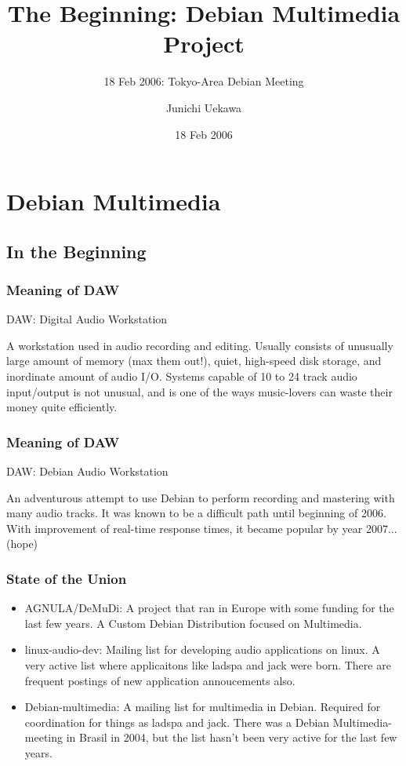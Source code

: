 \documentclass[dvipdfm]{beamer}
\title[Tokyo-Area Debian Meeting]{The Beginning: Debian Multimedia Project}
\subtitle{18 Feb 2006: Tokyo-Area Debian Meeting}
\author{Junichi Uekawa}
\date{18 Feb 2006}
\begin{document}
\frame{\titlepage{}}
 
 \section{Debian Multimedia}
 \subsection{In the Beginning}
 \begin{frame}
  \frametitle{Meaning of DAW}
   DAW: Digital Audio Workstation

  A workstation used in audio recording and editing. Usually consists of
  unusually large amount of memory (max them out!), quiet, high-speed
  disk storage, and inordinate amount of audio I/O. Systems capable of
  10 to 24 track audio input/output is not unusual, and is one of the
  ways music-lovers can waste their money quite efficiently.

 \end{frame}
 
 \begin{frame}
  \frametitle{Meaning of DAW}
  DAW: Debian Audio Workstation

  An adventurous attempt to use Debian to perform recording and mastering
  with many audio tracks. It was known to be a difficult path until
  beginning of 2006. With improvement of real-time response times, it
  became popular by year 2007... (hope)

 \end{frame}


\begin{frame}
\frametitle{State of the Union}
 \begin{itemize}
  \item AGNULA/DeMuDi:
	A project that ran in Europe with some funding for the last few
	years.
	A Custom Debian Distribution focused on Multimedia.
  \item linux-audio-dev: 
	Mailing list for developing audio applications on linux. 
	A very active list where applicaitons like ladspa and jack were born.
	There are frequent postings of new application annoucements also.
  \item Debian-multimedia: A mailing list for multimedia in Debian.
	Required for coordination for things as ladspa and jack.  There
	was a Debian Multimedia-meeting in Brasil in 2004, but the list
	hasn't been very active for the last few years.
 \end{itemize}
\end{frame}
\end{document}
